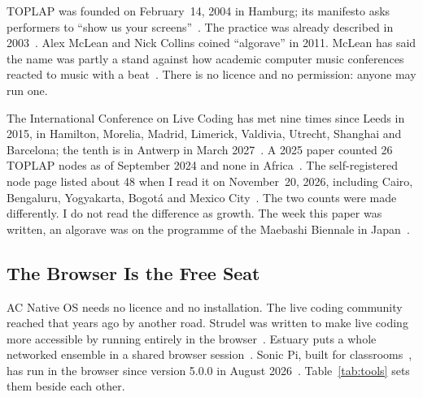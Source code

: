 \documentclass[10pt,letterpaper,twocolumn]{article}
\newcommand{\acos}{AC Native OS}
\begin{document}
TOPLAP was founded on February~14, 2004 in Hamburg; its manifesto asks performers to ``show us your screens''~\citep{blackwell2022livecoding, toplap2024twenty}. The practice was already described in 2003~\citep{collins2003livecoding}. Alex McLean and Nick Collins coined ``algorave'' in 2011. McLean has said the name was partly a stand against how academic computer music conferences reacted to music with a beat~\citep{temkin2015mclean, nowthen2014algorave}. There is no licence and no permission: anyone may run one.

The International Conference on Live Coding has met nine times since Leeds in 2015, in Hamilton, Morelia, Madrid, Limerick, Valdivia, Utrecht, Shanghai and Barcelona; the tenth is in Antwerp in March 2027~\citep{iclc2027}. A 2025 paper counted 26 TOPLAP nodes as of September 2024 and none in Africa~\citep{anastasopoulou2025toplapathens}. The self-registered node page listed about 48 when I read it on November~20, 2026, including Cairo, Bengaluru, Yogyakarta, Bogot\'{a} and Mexico City~\citep{toplapnodes}. The two counts were made differently. I do not read the difference as growth. The week this paper was written, an algorave was on the programme of the Maebashi Biennale in Japan~\citep{tadokoro2026maebashi}.

\subsection{The Browser Is the Free Seat}

\acos{} needs no licence and no installation. The live coding community reached that years ago by another road. Strudel was written to make live coding more accessible by running entirely in the browser~\citep{roos2023strudel}. Estuary puts a whole networked ensemble in a shared browser session~\citep{ogborn2017estuary}. Sonic Pi, built for classrooms~\citep{aaron2016sonicpi}, has run in the browser since version 5.0.0 in August 2026~\citep{sonicpi2026web}. Table~\ref{tab:tools} sets them beside each other.
\end{document}
